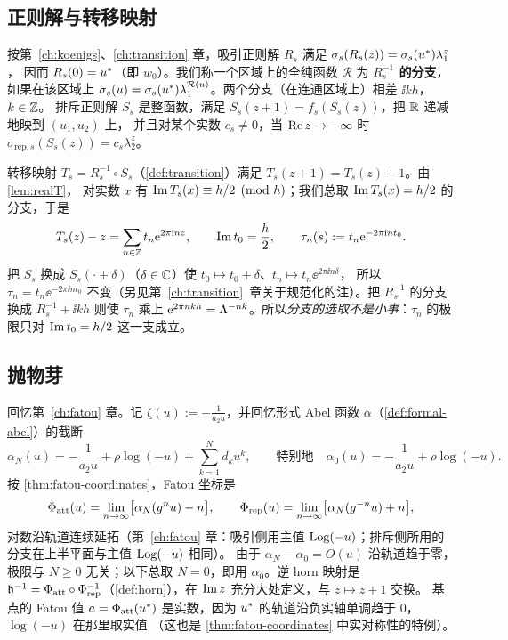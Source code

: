 \subsection{正则解与转移映射}
按第~\ref{ch:koenigs}、\ref{ch:transition} 章，吸引正则解 $R_s$ 满足 $\sigma_s(R_s(z))=\sigma_s(u^{*})\lambda_1^z$，
因而 $R_s(0)=u^{*}$（即 $w_0$）。我们称一个区域上的全纯函数 $\mathcal R$ 为 \textbf{$R_s^{-1}$ 的分支}，
如果在该区域上 $\sigma_s(u)=\sigma_s(u^{*})\lambda_1^{\mathcal R(u)}$。两个分支（在连通区域上）相差 $\ii kh$，$k\in\mathbb{Z}$。
排斥正则解 $S_s$ 是整函数，满足 $S_s(z+1)=f_s(S_s(z))$，把 $\mathbb{R}$ 递减地映到 $(u_1,u_2)$ 上，
并且对某个实数 $c_s\ne0$，当 $\operatorname{Re} z\to-\infty$ 时 $\sigma_{\mathrm{rep},s}(S_s(z))=c_s\lambda_2^z$。

转移映射 $T_s=R_s^{-1}\circ S_s$（\cref{def:transition}）满足 $T_s(z+1)=T_s(z)+1$。由 \cref{lem:realT}，
对实数 $x$ 有 $\operatorname{Im} T_s(x)\equiv h/2\pmod h$；我们总取 $\operatorname{Im} T_s(x)=h/2$ 的分支，于是
\[
 T_s(z)-z=\sum_{n\in\mathbb{Z}}t_n\mathrm{e}^{2\pi\mathrm{i} nz},\qquad \operatorname{Im} t_0=\frac h2,\qquad \tau_n(s):=t_n\mathrm{e}^{-2\pi\mathrm{i} nt_0}.
\]
把 $S_s$ 换成 $S_s(\cdot+\delta)$（$\delta\in\mathbb{C}$）使 $t_0\mapsto t_0+\delta$、$t_n\mapsto t_n\ee^{2\pi\ii n\delta}$，
所以 $\tau_n=t_n\ee^{-2\pi\ii nt_0}$ 不变（另见第~\ref{ch:transition}~章关于规范化的注）。把 $R_s^{-1}$ 的分支换成 $R_s^{-1}+\ii kh$ 则使 $\tau_n$ 乘上
$\mathrm{e}^{2\pi nkh}=\Lambda^{-nk}$。所以\emph{分支的选取不是小事}：$\tau_n$ 的极限只对 $\operatorname{Im} t_0=h/2$ 这一支成立。

\subsection{抛物芽}
回忆第~\ref{ch:fatou} 章。记 $\zeta(u):=-\frac1{a_2u}$，并回忆形式 Abel 函数 $\alpha$（\cref{def:formal-abel}）的截断
\[
 \alpha_N(u)=-\frac1{a_2u}+\rho\log(-u)+\sum_{k=1}^Nd_ku^k,\qquad\text{特别地}\quad \alpha_0(u)=-\frac1{a_2u}+\rho\log(-u).
\]
按 \cref{thm:fatou-coordinates}，Fatou 坐标是
\[
 \Phi_{\mathrm{att}}(u)=\lim_{n\to\infty}\bigl[\alpha_N(g^nu)-n\bigr],\qquad
 \Phi_{\mathrm{rep}}(u)=\lim_{n\to\infty}\bigl[\alpha_N(g^{-n}u)+n\bigr],
\]
对数沿轨道连续延拓（第~\ref{ch:fatou} 章：吸引侧用主值 $\operatorname{Log}(-u)$；排斥侧所用的分支在上半平面与主值 $\operatorname{Log}(-u)$ 相同）。
由于 $\alpha_N-\alpha_0=O(u)$ 沿轨道趋于零，极限与 $N\ge0$ 无关；以下总取 $N=0$，即用 $\alpha_0$。逆 horn 映射是
$\mathfrak h^{-1}=\Phi_{\mathrm{att}}\circ\Phi_{\mathrm{rep}}^{-1}$（\cref{def:horn}），在 $\operatorname{Im} z$ 充分大处定义，与 $z\mapsto z+1$ 交换。
基点的 Fatou 值 $a=\Phi_{\mathrm{att}}(u^{*})$ 是实数，因为 $u^{*}$ 的轨道沿负实轴单调趋于 $0$，$\log(-u)$ 在那里取实值
（这也是 \cref{thm:fatou-coordinates} 中实对称性的特例）。

